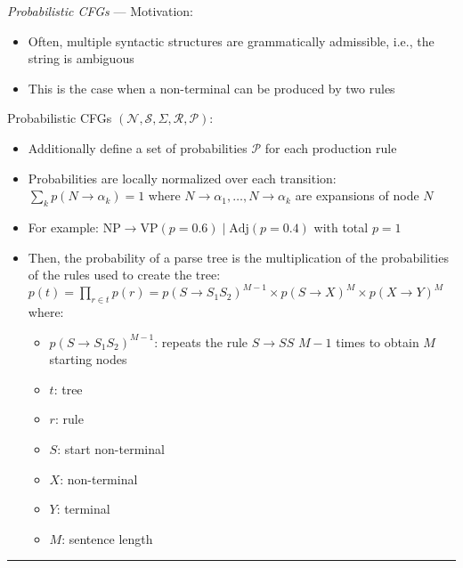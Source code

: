 \emph{Probabilistic CFGs} ---
Motivation:
\begin{itemize}
    \item Often, multiple syntactic structures are grammatically admissible, i.e., the string is ambiguous
    \item This is the case when a non-terminal can be produced by two rules
\end{itemize}
Probabilistic CFGs $(\mathcal{N}, \mathcal{S}, \Sigma, \mathcal{R}, \mathcal{P})$:
\begin{itemize}
    \item Additionally define a set of probabilities $\mathcal{P}$ for each production rule
    \item Probabilities are locally normalized over each transition:
    $
    \sum_{k} p(N \to \alpha_k) = 1
    $
    where $N \to \alpha_1, \dots, N \to \alpha_k$ are expansions of node $N$
    \item For example:
    $
    \text{NP} \to \text{VP} (p = 0.6) \mid \text{Adj} (p = 0.4)
    $
    with total $p = 1$
    \item Then, the probability of a parse tree is the multiplication of the probabilities of the rules used to create the tree:
    $
    p(t) = \prod_{r \in t} p(r) = p(S \to S_1 S_2)^{M-1} \times p(S \to X)^M \times p(X \to Y)^M
    $
    where:
    \begin{itemize}
        \item $p(S \to S_1 S_2)^{M-1}$: repeats the rule $S \to SS$ $M-1$ times to obtain $M$ starting nodes
        \item $t$: tree
        \item $r$: rule
        \item $S$: start non-terminal
        \item $X$: non-terminal
        \item $Y$: terminal
        \item $M$: sentence length
    \end{itemize}
\end{itemize}

{\color{lightgray}\hrule height 0.001mm}

